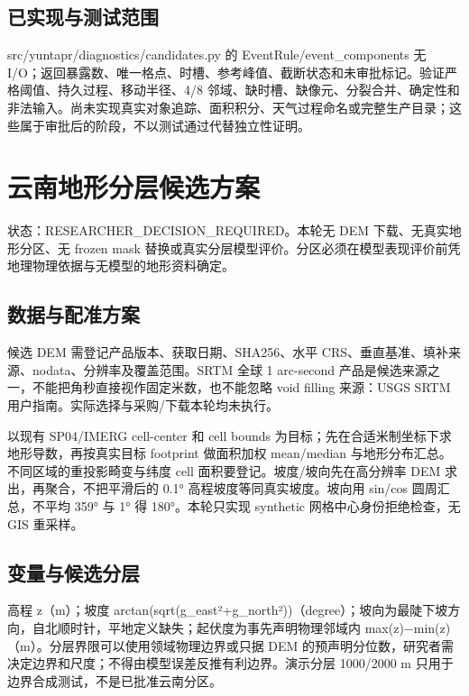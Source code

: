 \documentclass[UTF8,a4paper,10pt,fontset=fandol]{ctexart}
\begin{document}
\subsection*{已实现与测试范围}

src/yuntapr/diagnostics/candidates.py 的 EventRule/event\_components 无 I/O；返回暴露数、唯一格点、时槽、参考峰值、截断状态和未审批标记。验证严格阈值、持久过程、移动半径、4/8 邻域、缺时槽、缺像元、分裂合并、确定性和非法输入。尚未实现真实对象追踪、面积积分、天气过程命名或完整生产目录；这些属于审批后的阶段，不以测试通过代替独立性证明。\par

\clearpage
\section*{云南地形分层候选方案}

状态：RESEARCHER\_DECISION\_REQUIRED。本轮无 DEM 下载、无真实地形分区、无 frozen mask 替换或真实分层模型评价。分区必须在模型表现评价前凭地理物理依据与无模型的地形资料确定。\par

\subsection*{数据与配准方案}

候选 DEM 需登记产品版本、获取日期、SHA256、水平 CRS、垂直基准、填补来源、nodata、分辨率及覆盖范围。SRTM 全球 1 arc-second 产品是候选来源之一，不能把角秒直接视作固定米数，也不能忽略 void filling 来源：USGS SRTM 用户指南。实际选择与采购/下载本轮均未执行。\par

以现有 SP04/IMERG cell-center 和 cell bounds 为目标；先在合适米制坐标下求地形导数，再按真实目标 footprint 做面积加权 mean/median 与地形分布汇总。不同区域的重投影畸变与纬度 cell 面积要登记。坡度/坡向先在高分辨率 DEM 求出，再聚合，不把平滑后的 0.1° 高程坡度等同真实坡度。坡向用 sin/cos 圆周汇总，不平均 359° 与 1° 得 180°。本轮只实现 synthetic 网格中心身份拒绝检查，无 GIS 重采样。\par

\subsection*{变量与候选分层}

高程 z（m）；坡度 arctan(sqrt(g\_east²+g\_north²))（degree）；坡向为最陡下坡方向，自北顺时针，平地定义缺失；起伏度为事先声明物理邻域内 max(z)−min(z)（m）。分层界限可以使用领域物理边界或只据 DEM 的预声明分位数，研究者需决定边界和尺度；不得由模型误差反推有利边界。演示分层 1000/2000 m 只用于边界合成测试，不是已批准云南分区。\par
\end{document}
